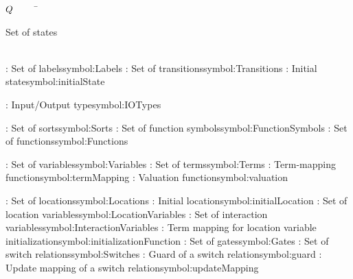 \begin{tabbing}
$Q$~~~~~\=\parbox{5in}{Set of states\dotfill \pageref{symbol:States}}\\
\addsymbol \Labels: {Set of labels}{symbol:Labels}
\addsymbol \Transitions: {Set of transitions}{symbol:Transitions}
\addsymbol \initialState: {Initial state}{symbol:initialState}

\addsymbol \IOTypes: {Input/Output type}{symbol:IOTypes}

\addsymbol \Sorts: {Set of sorts}{symbol:Sorts}
\addsymbol \FunctionSymbols: {Set of function symbols}{symbol:FunctionSymbols}
\addsymbol \Functions: {Set of functions}{symbol:Functions}

\addsymbol \Variables: {Set of variables}{symbol:Variables}
\addsymbol \Terms: {Set of terms}{symbol:Terms}
\addsymbol \termMapping: {Term-mapping function}{symbol:termMapping}
\addsymbol \valuation: {Valuation function}{symbol:valuation}

\addsymbol \Locations: {Set of locations}{symbol:Locations}
\addsymbol \initialLocation: {Initial location}{symbol:initialLocation}
\addsymbol \LocationVariables: {Set of location variables}{symbol:LocationVariables}
\addsymbol \InteractionVariables: {Set of interaction variables}{symbol:InteractionVariables}
\addsymbol \initializationFunction: {Term mapping for location variable initialization}{symbol:initializationFunction}
\addsymbol \Gates: {Set of gates}{symbol:Gates}
\addsymbol \Switches: {Set of switch relations}{symbol:Switches}
\addsymbol \guard: {Guard of a switch relation}{symbol:guard}
\addsymbol \updateMapping: {Update mapping of a switch relation}{symbol:updateMapping}


\end{tabbing}
